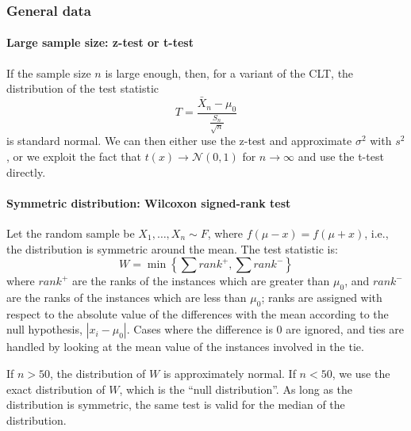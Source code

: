 \subsubsection{General data}
\paragraph{Large sample size: z-test or t-test}
If the sample size $n$ is large enough, then, for a variant of the CLT, the distribution of the test statistic
\begin{equation*}
    T = \frac{\bar{X}_n - \mu_0}{\frac{S_n}{\sqrt{n}}}
\end{equation*} 
is standard normal. We can then either use the z-test and approximate $\sigma^2$ with $s^2$, or we exploit the fact that $t(x) \to \mathcal{N}(0,1)$ for $n \to \infty$ and use the t-test directly.

\paragraph{Symmetric distribution: Wilcoxon signed-rank test}
Let the random sample be $X_1, \ldots, X_n \sim F$, where $f(\mu-x) = f(\mu+x)$, i.e., the distribution is symmetric around the mean. The test statistic is:
\begin{equation*}
    W = \min \left\{ \sum \textit{rank}^+, \sum \textit{rank}^- \right\}
\end{equation*}
where $\textit{rank}^+$ are the ranks of the instances which are greater than $\mu_0$, and $\textit{rank}^-$ are the ranks of the instances which are less than $\mu_0$; ranks are assigned with respect to the absolute value of the differences with the mean according to the null hypothesis, $|x_i - \mu_0|$. Cases where the difference is 0 are ignored, and ties are handled by looking at the mean value of the instances involved in the tie.

If $n > 50$, the distribution of $W$ is approximately normal. If $n < 50$, we use the exact distribution of $W$, which is the ``null distribution''. As long as the distribution is symmetric, the same test is valid for the median of the distribution.

